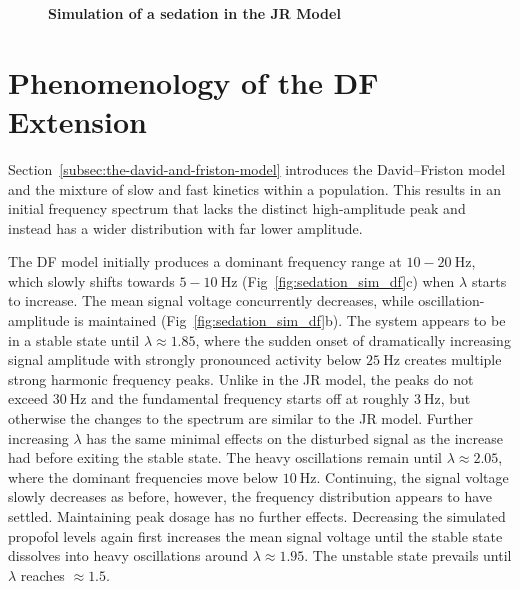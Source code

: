 \begin{figure}[H]

\caption{\textbf{Simulation of a sedation in the JR Model}
}\label{fig:sedation_sim_jr}
\end{figure}

\toggletrue{drawLocRoc}
\def\simRunName{DF_SEDATION_150}
\def\simRunTime{151}
\def\locStart{1.85}
\def\locST{33.5} %
\def\locEnd{2.05}
\def\locET{39.75}%
\def\rocStart{1.95}
\def\rocST{114.72}%
\def\rocEnd{1.5}
\def\rocET{128.81}%
\section{Phenomenology of the DF Extension}\label{subsec:phenomenology-of-the-df-extension}
Section~\ref{subsec:the-david-and-friston-model} introduces the David--Friston model and
    the mixture of slow and fast kinetics within a population.
    This results in an initial frequency spectrum
    that lacks the distinct high-amplitude peak and instead has a wider distribution with far lower amplitude.

    The DF model initially produces a dominant frequency range at $10-20 \SI{}{\hertz} $,
    which slowly shifts towards $ 5-10 \SI{}{\hertz} $ (Fig~\ref{fig:sedation_sim_df}c) when $\lambda$ starts to increase.
    The mean signal voltage concurrently decreases,
    while oscillation-amplitude is maintained (Fig~\ref{fig:sedation_sim_df}b).
    The system appears to be in a stable state until $ \lambda \approx \locStart $,
    where the sudden onset of dramatically
    increasing signal amplitude with strongly pronounced activity below $ \SI{25}{\hertz} $
    creates multiple strong harmonic frequency peaks.
    Unlike in the JR model, the peaks do not exceed  $ \SI{30}{\hertz} $ and the fundamental frequency starts off
    at roughly $\SI{3}{\hertz}$,
    but otherwise the changes to the spectrum are similar to the JR model.
    Further increasing $\lambda$ has the same minimal effects on the disturbed signal
    as the increase had before exiting the stable state.
    The heavy oscillations remain until $\lambda \approx \locEnd $,
    where the dominant frequencies move below $\SI{10}{\hertz}$.
    Continuing, the signal voltage slowly decreases as before,
    however, the frequency distribution appears to have settled.
    Maintaining peak dosage has no further effects.
    Decreasing the simulated propofol levels again first increases the mean signal voltage
    until the stable state dissolves into heavy oscillations around $\lambda \approx \rocStart$.
    The unstable state prevails until $\lambda$ reaches $\approx \rocEnd$.


